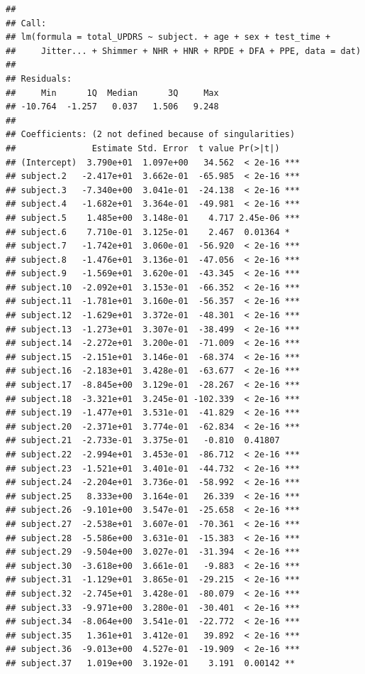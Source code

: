\documentclass[
]{article}
\begin{document}
\begin{verbatim}
## 
## Call:
## lm(formula = total_UPDRS ~ subject. + age + sex + test_time + 
##     Jitter... + Shimmer + NHR + HNR + RPDE + DFA + PPE, data = dat)
## 
## Residuals:
##     Min      1Q  Median      3Q     Max 
## -10.764  -1.257   0.037   1.506   9.248 
## 
## Coefficients: (2 not defined because of singularities)
##               Estimate Std. Error  t value Pr(>|t|)    
## (Intercept)  3.790e+01  1.097e+00   34.562  < 2e-16 ***
## subject.2   -2.417e+01  3.662e-01  -65.985  < 2e-16 ***
## subject.3   -7.340e+00  3.041e-01  -24.138  < 2e-16 ***
## subject.4   -1.682e+01  3.364e-01  -49.981  < 2e-16 ***
## subject.5    1.485e+00  3.148e-01    4.717 2.45e-06 ***
## subject.6    7.710e-01  3.125e-01    2.467  0.01364 *  
## subject.7   -1.742e+01  3.060e-01  -56.920  < 2e-16 ***
## subject.8   -1.476e+01  3.136e-01  -47.056  < 2e-16 ***
## subject.9   -1.569e+01  3.620e-01  -43.345  < 2e-16 ***
## subject.10  -2.092e+01  3.153e-01  -66.352  < 2e-16 ***
## subject.11  -1.781e+01  3.160e-01  -56.357  < 2e-16 ***
## subject.12  -1.629e+01  3.372e-01  -48.301  < 2e-16 ***
## subject.13  -1.273e+01  3.307e-01  -38.499  < 2e-16 ***
## subject.14  -2.272e+01  3.200e-01  -71.009  < 2e-16 ***
## subject.15  -2.151e+01  3.146e-01  -68.374  < 2e-16 ***
## subject.16  -2.183e+01  3.428e-01  -63.677  < 2e-16 ***
## subject.17  -8.845e+00  3.129e-01  -28.267  < 2e-16 ***
## subject.18  -3.321e+01  3.245e-01 -102.339  < 2e-16 ***
## subject.19  -1.477e+01  3.531e-01  -41.829  < 2e-16 ***
## subject.20  -2.371e+01  3.774e-01  -62.834  < 2e-16 ***
## subject.21  -2.733e-01  3.375e-01   -0.810  0.41807    
## subject.22  -2.994e+01  3.453e-01  -86.712  < 2e-16 ***
## subject.23  -1.521e+01  3.401e-01  -44.732  < 2e-16 ***
## subject.24  -2.204e+01  3.736e-01  -58.992  < 2e-16 ***
## subject.25   8.333e+00  3.164e-01   26.339  < 2e-16 ***
## subject.26  -9.101e+00  3.547e-01  -25.658  < 2e-16 ***
## subject.27  -2.538e+01  3.607e-01  -70.361  < 2e-16 ***
## subject.28  -5.586e+00  3.631e-01  -15.383  < 2e-16 ***
## subject.29  -9.504e+00  3.027e-01  -31.394  < 2e-16 ***
## subject.30  -3.618e+00  3.661e-01   -9.883  < 2e-16 ***
## subject.31  -1.129e+01  3.865e-01  -29.215  < 2e-16 ***
## subject.32  -2.745e+01  3.428e-01  -80.079  < 2e-16 ***
## subject.33  -9.971e+00  3.280e-01  -30.401  < 2e-16 ***
## subject.34  -8.064e+00  3.541e-01  -22.772  < 2e-16 ***
## subject.35   1.361e+01  3.412e-01   39.892  < 2e-16 ***
## subject.36  -9.013e+00  4.527e-01  -19.909  < 2e-16 ***
## subject.37   1.019e+00  3.192e-01    3.191  0.00142 ** 

\end{verbatim}
\end{document}
